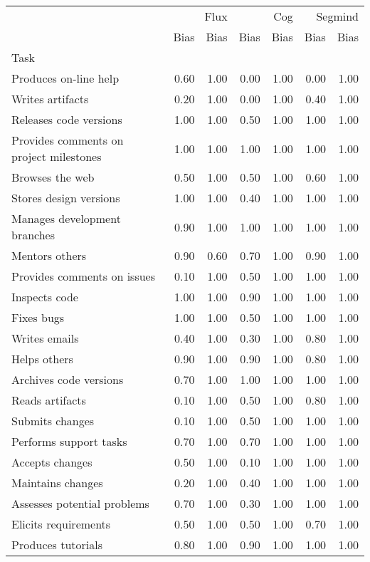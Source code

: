 \begin{tabular}{lrrrrrr}
\toprule
 & \multicolumn{2}{r}{Flux} & \multicolumn{2}{r}{Cog} & \multicolumn{2}{r}{Segmind} \\
 & Bias & Bias & Bias & Bias & Bias & Bias \\
Task &  &  &  &  &  &  \\
\midrule
Produces on-line help & 0.60 & 1.00 & 0.00 & 1.00 & 0.00 & 1.00 \\
Writes artifacts & 0.20 & 1.00 & 0.00 & 1.00 & 0.40 & 1.00 \\
Releases code versions & 1.00 & 1.00 & 0.50 & 1.00 & 1.00 & 1.00 \\
Provides comments on project milestones & 1.00 & 1.00 & 1.00 & 1.00 & 1.00 & 1.00 \\
Browses the web & 0.50 & 1.00 & 0.50 & 1.00 & 0.60 & 1.00 \\
Stores design versions & 1.00 & 1.00 & 0.40 & 1.00 & 1.00 & 1.00 \\
Manages development branches & 0.90 & 1.00 & 1.00 & 1.00 & 1.00 & 1.00 \\
Mentors others & 0.90 & 0.60 & 0.70 & 1.00 & 0.90 & 1.00 \\
Provides comments on issues & 0.10 & 1.00 & 0.50 & 1.00 & 1.00 & 1.00 \\
Inspects code & 1.00 & 1.00 & 0.90 & 1.00 & 1.00 & 1.00 \\
Fixes bugs & 1.00 & 1.00 & 0.50 & 1.00 & 1.00 & 1.00 \\
Writes emails & 0.40 & 1.00 & 0.30 & 1.00 & 0.80 & 1.00 \\
Helps others & 0.90 & 1.00 & 0.90 & 1.00 & 0.80 & 1.00 \\
Archives code versions & 0.70 & 1.00 & 1.00 & 1.00 & 1.00 & 1.00 \\
Reads artifacts & 0.10 & 1.00 & 0.50 & 1.00 & 0.80 & 1.00 \\
Submits changes & 0.10 & 1.00 & 0.50 & 1.00 & 1.00 & 1.00 \\
Performs support tasks & 0.70 & 1.00 & 0.70 & 1.00 & 1.00 & 1.00 \\
Accepts changes & 0.50 & 1.00 & 0.10 & 1.00 & 1.00 & 1.00 \\
Maintains changes & 0.20 & 1.00 & 0.40 & 1.00 & 1.00 & 1.00 \\
Assesses potential problems & 0.70 & 1.00 & 0.30 & 1.00 & 1.00 & 1.00 \\
Elicits requirements & 0.50 & 1.00 & 0.50 & 1.00 & 0.70 & 1.00 \\
Produces tutorials & 0.80 & 1.00 & 0.90 & 1.00 & 1.00 & 1.00 \\

\end{tabular}
